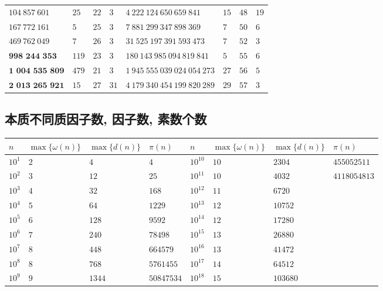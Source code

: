 \begin{tabular}{llll|llll}
    \(104~857~601\)            & \(25\)  & \(22\) & \(3\)  & \(4~222~124~650~659~841\)     & \(15\) & \(48\) & \(19\) \\
    \(167~772~161\)            & \(5\)   & \(25\) & \(3\)  & \(7~881~299~347~898~369\)     & \(7\)  & \(50\) & \(6\)  \\
    \(469~762~049\)            & \(7\)   & \(26\) & \(3\)  & \(31~525~197~391~593~473\)    & \(7\)  & \(52\) & \(3\)  \\
    \(\textbf{998~244~353}\)   & \(119\) & \(23\) & \(3\)  & \(180~143~985~094~819~841\)   & \(5\)  & \(55\) & \(6\)  \\
    \(\textbf{1~004~535~809}\) & \(479\) & \(21\) & \(3\)  & \(1~945~555~039~024~054~273\) & \(27\) & \(56\) & \(5\)  \\
    \(\textbf{2~013~265~921}\) & \(15\)  & \(27\) & \(31\) & \(4~179~340~454~199~820~289\) & \(29\) & \(57\) & \(3\)  \\
    \hline
\end{tabular}

\subsection{本质不同质因子数, 因子数, 素数个数}

\begin{tabular}{llll|llll}
    \hline
    \(n\)    & \(\max\{\omega(n)\}\) & \(\max\{d(n)\}\) & \(\pi(n)\)   & \(n\)       & \(\max\{\omega(n)\}\) & \(\max\{d(n)\}\) & \(\pi(n)\)     \\
    \hline
    \(10^1\) & \(2\)                 & \(4\)            & \(4\)        & \(10^{10}\) & \(10\)                & \(2304\)         & \(455052511\)  \\
    \(10^2\) & \(3\)                 & \(12\)           & \(25\)       & \(10^{11}\) & \(10\)                & \(4032\)         & \(4118054813\) \\
    \(10^3\) & \(4\)                 & \(32\)           & \(168\)      & \(10^{12}\) & \(11\)                & \(6720\)         &                \\
    \(10^4\) & \(5\)                 & \(64\)           & \(1229\)     & \(10^{13}\) & \(12\)                & \(10752\)        &                \\
    \(10^5\) & \(6\)                 & \(128\)          & \(9592\)     & \(10^{14}\) & \(12\)                & \(17280\)        &                \\
    \(10^6\) & \(7\)                 & \(240\)          & \(78498\)    & \(10^{15}\) & \(13\)                & \(26880\)        &                \\
    \(10^7\) & \(8\)                 & \(448\)          & \(664579\)   & \(10^{16}\) & \(13\)                & \(41472\)        &                \\
    \(10^8\) & \(8\)                 & \(768\)          & \(5761455\)  & \(10^{17}\) & \(14\)                & \(64512\)        &                \\
    \(10^9\) & \(9\)                 & \(1344\)         & \(50847534\) & \(10^{18}\) & \(15\)                & \(103680\)       &                \\
    \hline
\end{tabular}
